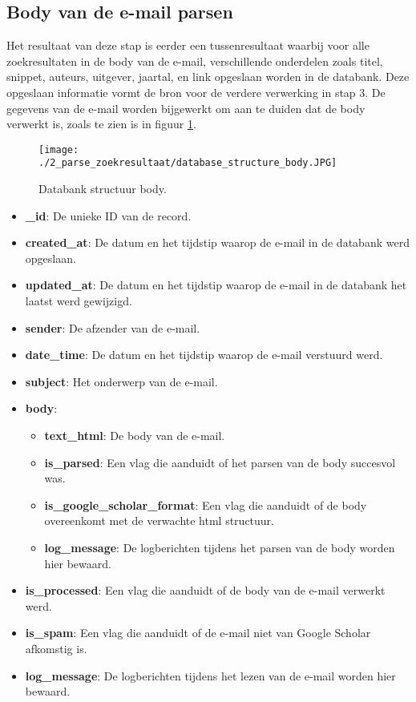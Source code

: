 \subsection{Body van de e-mail parsen}
Het resultaat van deze stap is eerder een tussenresultaat waarbij voor alle zoekresultaten in de body van de e-mail, verschillende onderdelen zoals titel, snippet, auteurs, uitgever, jaartal, en link opgeslaan worden in de databank. Deze opgeslaan informatie vormt de bron voor de verdere verwerking in stap 3.
De gegevens van de e-mail worden bijgewerkt om aan te duiden dat de body verwerkt is, zoals te zien is in figuur \ref{fig:databank_structuur_body}.
\begin{figure}
    \centering
    \texttt{[image: ./2\_parse\_zoekresultaat/database\_structure\_body.JPG]}
    \caption[Databank structuur body.]{\label{fig:databank_structuur_body}Databank structuur body.}
\end{figure}
\begin{itemize}
    \item \textbf{\_id}: De unieke ID van de record.
    \item \textbf{created\_at}: De datum en het tijdstip waarop de e-mail in de databank werd opgeslaan.
    \item \textbf{updated\_at}: De datum en het tijdstip waarop de e-mail in de databank het laatst werd gewijzigd. 
    \item \textbf{sender}: De afzender van de e-mail.
    \item \textbf{date\_time}: De datum en het tijdstip waarop de e-mail verstuurd werd.
    \item \textbf{subject}: Het onderwerp van de e-mail. 
    \item \textbf{body}: 
    \begin{itemize}
        \item \textbf{text\_html}: De body van de e-mail.
        \item \textbf{is\_parsed}: Een vlag die aanduidt of het parsen van de body succesvol was.
        \item \textbf{is\_google\_scholar\_format}: Een vlag die aanduidt of de body overeenkomt met de verwachte html structuur.
        \item \textbf{log\_message}: De logberichten tijdens het parsen van de body worden hier bewaard.
    \end{itemize}
    \item \textbf{is\_processed}: Een vlag die aanduidt of de body van de e-mail verwerkt werd.
    \item \textbf{is\_spam}: Een vlag die aanduidt of de e-mail niet van Google Scholar afkomstig is. 
    \item \textbf{log\_message}: De logberichten tijdens het lezen van de e-mail worden hier bewaard. 
\end{itemize}
